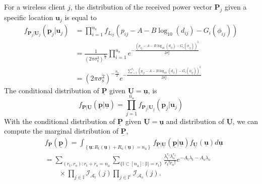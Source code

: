 For a wireless client $j$, the distribution of the received power vector $\mathbf{P}_j$ given a specific location $\mathbf{u}_j$ is equal to
\begin{equation} 
\begin{split}
f_{\mathbf{P}_j | \mathbf{U}_j} (\mathbf{p}_{j} | \mathbf{u}_j)
&= \prod_{i=1}^{n_{\mathrm{s}}}
f_{L_{ij}} ( p_{ij} - A - B \log_{10} (d_{ij}) - G_i(\phi_{ij}) ) \\
&= \frac{1}{\left( 2 \pi \sigma_{\mathrm{s}}^2 \right)^{\frac{n_{\mathrm{s}}}{2} }}
\prod_{i=1}^{n_{\mathrm{s}}} e^{- \frac{( p_{ij} - A - B \log_{10} (d_{ij}) - G_i(\phi_{ij}) )^2}{2 \sigma_{\mathrm{s}}^2} } \\
&= \left( 2 \pi \sigma_{\mathrm{s}}^2 \right)^{- \frac{n_{\mathrm{s}}}{2}}
e^{- \frac{ \sum_{i=1}^{n_{\mathrm{s}}}
		(p_{ij} - A - B \log_{10} (d_{ij}) - G_i(\phi_{ij}))^2}
	{2 \sigma_{\mathrm{s}}^2}} 
\end{split}
\end{equation}
The conditional distribution of $\underline{\mathbf{P}}$ given $\underline{\mathbf{U}}=\underline{\mathbf{u}}$, is
\begin{equation} \label{equation:CondDistP}
f_{\underline{\mathbf{P}} | \underline{\mathbf{U}}}
\left( \underline{\mathbf{p}} | \underline{\mathbf{u}} \right)
= \prod_{j=1}^{n_{\mathrm{a}}}
f_{\mathbf{P}_j | \mathbf{U}_j} (\mathbf{p}_{j}|\mathbf{u}_j) 
\end{equation}
With the conditional distribution of $\underline{\mathbf{P}}$ given $\underline{\mathbf{U}}=\underline{\mathbf{u}}$ and distribution of $\underline{\mathbf{U}}$, we can compute the marginal distribution of $\underline{\mathbf{P}}$,
\begin{equation*}
\begin{split}
&f_{\underline{\mathbf{P}}} \left( \underline{\mathbf{p}} \right)
= \int_{ \left\{ \underline{\mathbf{u}}
	: R_{\mathrm{t}}(\underline{\mathbf{u}}) 
	+ R_{\mathrm{o}}(\underline{\mathbf{u}}) = n_{\mathrm{a}} \right\} }
f_{\underline{\mathbf{P}} | \underline{\mathbf{U}}}
\left( \underline{\mathbf{p}} | \underline{\mathbf{u}} \right)
f_{\underline{\mathbf{U}}}(\underline{\mathbf{u}})
d\underline{\mathbf{u}} \\
&= \sum_{(r_{\mathrm{t}}, r_{\mathrm{o}}) :
	r_{\mathrm{t}} + r_{\mathrm{o}} = n_{\mathrm{a}}}
\sum_{\{ \mathbb{I} \subset [n_{\mathrm{a}}]
	: |\mathbb{I}| = r_{\mathrm{t}} \}}
\frac{\lambda_{\mathrm{t}}^{r_{\mathrm{t}}}
	\lambda_{\mathrm{o}}^{r_{\mathrm{o}}}}
{r_{\mathrm{t}}! r_{\mathrm{o}}!}
e^{- A_{\mathrm{t}} \lambda_{\mathrm{t}}
	- A_{\mathrm{o}} \lambda_{\mathrm{o}}} \\
&\qquad \times
\prod_{j \in \mathbb{I}} \mathcal{I}_{\mathcal{A}_{\mathrm{t}}}(j)
\prod_{j \in \mathbb{I}^{\mathrm{c}}}
\mathcal{I}_{\mathcal{A}_{\mathrm{o}}}(j) .
\end{split}
\end{equation*}
